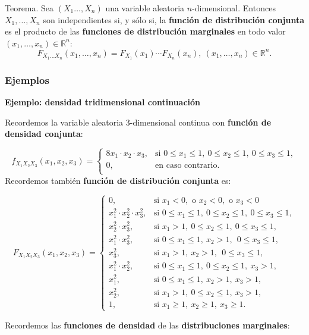\documentclass[
  letterpaper,
  DIV=11,
  numbers=noendperiod]{scrreprt}
\begin{document}
Teorema. Sea \((X_1\ldots,X_n)\) una variable aleatoria
\(n\)-dimensional. Entonces \(X_1,\ldots,X_n\) son independientes si, y
sólo si, la \textbf{función de distribución conjunta} es el producto de
las \textbf{funciones de distribución marginales} en todo valor
\((x_1,\ldots,x_n)\in\mathbb{R}^n\): \[
F_{X_1\ldots X_n}(x_1,\ldots,x_n)=F_{X_1}(x_1)\cdots F_{X_n}(x_n),\ (x_1,\ldots,x_n)\in\mathbb{R}^n.
\]

\hypertarget{ejemplos-11}{%
\subsubsection{Ejemplos}\label{ejemplos-11}}

\textbf{Ejemplo: densidad tridimensional continuación}

Recordemos la variable aleatoria \(3\)-dimensional continua con
\textbf{función de densidad conjunta}:

\[
f_{X_1X_2X_3}(x_1,x_2,x_3)=\begin{cases}
8 x_1\cdot x_2\cdot x_3, & \mbox{si }0\leq x_1\leq 1,\ 0\leq x_2\leq 1,\ 0\leq x_3\leq 1, \\
0, & \mbox{en caso contrario.}\\
\end{cases}
\] Recordemos también \textbf{función de distribución conjunta} es:

\[
F_{X_1X_2X_3}(x_1,x_2,x_3)=\begin{cases}
0, & \mbox{si }x_1<0,\mbox{ o }x_2<0,\mbox{ o }x_3 <0\\
x_1^2\cdot x_2^2\cdot x_3^2, & \mbox{si }0\leq x_1\leq 1,\ 0\leq x_2\leq 1,\ 0\leq x_3\leq 1, \\
 x_2^2\cdot x_3^2, & \mbox{si }x_1> 1,\ 0\leq x_2\leq  1,\ 0\leq x_3\leq  1, \\
 x_1^2\cdot x_3^2, & \mbox{si }0\leq x_1\leq  1,\ x_2> 1,\ \ 0\leq x_3\leq  1, \\
 x_3^2, & \mbox{si }x_1> 1,\ x_2> 1,\ \ 0\leq x_3\leq  1, \\
 x_1^2\cdot x_2^2, & \mbox{si }0\leq x_1\leq  1,\ 0\leq x_2\leq  1,\ x_3> 1,\\
 x_1^2, & \mbox{si }0\leq x_1\leq  1,\ x_2 >  1,\ x_3> 1,\\
 x_2^2, & \mbox{si }x_1>1,\ 0\leq x_2\leq  1,\ x_3> 1,\\
1, & \mbox{si }x_1\geq 1,\ x_2\geq 1,\ x_3\geq 1.
\end{cases}
\]

Recordemos las \textbf{funciones de densidad} de las
\textbf{distribuciones marginales}:
\end{document}
